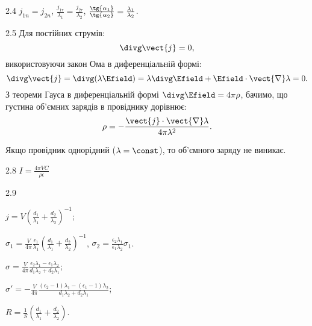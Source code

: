 \protect \section *{\protect {}}
\begin{Solution}{2.{4}}
	$j_{1n} = j_{2n}$, $\frac{j_{1\tau}}{\lambda_1} = \frac{j_{2\tau}}{\lambda_2}$,
	$\frac{\tg{\alpha_1}}{\tg{\alpha_2}} = \frac{\lambda_1}{\lambda_2}$.
\end{Solution}
\begin{Solution}{2.{5}}
	Для постійних струмів:
	\begin{equation}
		\divg\vect{j} = 0,
	\end{equation}
	використовуючи закон Ома в диференціальній формі:
	\begin{equation}
		\divg\vect{j} = \divg(\lambda\Efield) = \lambda\divg\Efield + \Efield\cdot\vect{\nabla}\lambda = 0.
	\end{equation}
	З теореми Гауса в диференціальній формі $\divg\Efield = 4\pi\rho$, бачимо, що густина об'ємних зарядів в провіднику дорівнює:
	\begin{equation}
		\rho = - \frac{\vect{j}\cdot\vect{\nabla}\lambda}{4\pi\lambda^2}.
	\end{equation}

	Якщо провідник однорідний ($\lambda = \const$), то об'ємного заряду не виникає.
\end{Solution}
\begin{Solution}{2.{8}}
	$ I = \frac{4\pi VC}{\rho \epsilon} $
\end{Solution}
\begin{Solution}{2.{9}}
	\begin{enumerate*}[label=\alph*)]
		\item  $j = V\left( \frac{d_1}{\lambda_1} + \frac{d_2}{\lambda_2}\right)^{-1}$;
		\item $\sigma_1  = \frac{V}{4\pi} \frac{\epsilon_1}{\lambda_1} \left( \frac{d_1}{\lambda_1} + \frac{d_2}{\lambda_2}\right)^{-1}$, $\sigma_2  = \frac{\epsilon_2\lambda_1}{\epsilon_1\lambda_2} \sigma_1$.
		\item $\sigma = \frac{V}{4\pi} \frac{\epsilon_2\lambda_1 - \epsilon_1\lambda_2}{d_1\lambda_2 + d_2\lambda_1}$;
		\item $\sigma' = - \frac{V}{4\pi} \frac{(\epsilon_2 - 1)\lambda_1 - (\epsilon_1 - 1)\lambda_2}{d_1\lambda_2 + d_2\lambda_1}$;
		\item $R = \frac1S\left( \frac{d_1}{\lambda_1} + \frac{d_2}{\lambda_2}\right) $.
	\end{enumerate*}
\end{Solution}
